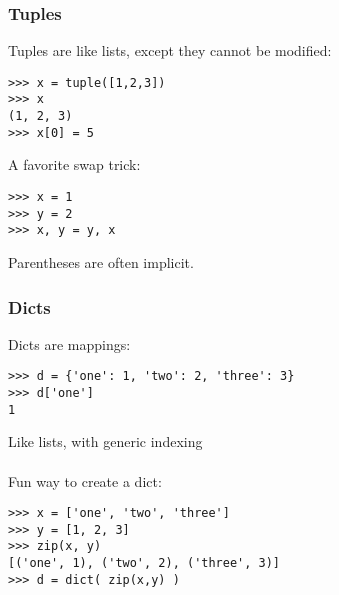 \documentclass[red]{beamer}
\begin{document}
\begin{frame}[fragile]
    \frametitle{Tuples}

    Tuples are like lists, except they cannot be modified:
    \begin{lstlisting}
>>> x = tuple([1,2,3])
>>> x
(1, 2, 3)
>>> x[0] = 5
    \end{lstlisting}
    A favorite swap trick:
    \begin{lstlisting}
>>> x = 1
>>> y = 2
>>> x, y = y, x
    \end{lstlisting}
    Parentheses are often implicit.
\end{frame}
\begin{frame}[fragile]
    \frametitle{Dicts}

    Dicts are mappings:
    \begin{lstlisting}
>>> d = {'one': 1, 'two': 2, 'three': 3}
>>> d['one']
1
    \end{lstlisting}
    Like lists, with generic indexing
    \\~\\
    Fun way to create a dict:
    \begin{lstlisting}
>>> x = ['one', 'two', 'three']
>>> y = [1, 2, 3]
>>> zip(x, y)
[('one', 1), ('two', 2), ('three', 3)]
>>> d = dict( zip(x,y) )
    \end{lstlisting}
\end{frame}
\end{document}
